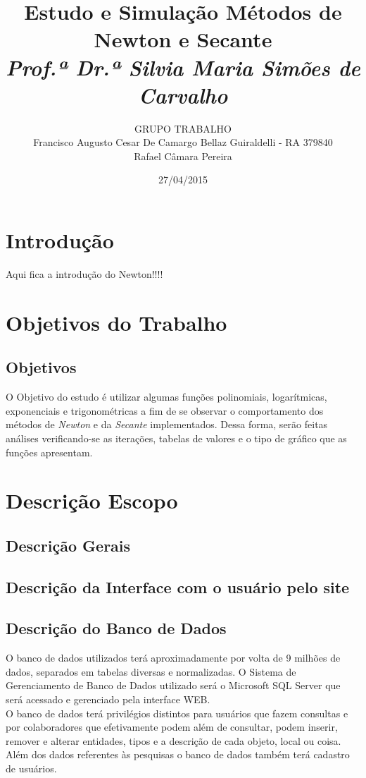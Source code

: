 \documentclass[ruledheader, 12pt, onecolumn, a4paper] {report}%
\author{GRUPO TRABALHO\\ Francisco Augusto Cesar De Camargo Bellaz Guiraldelli - RA 379840\\ Rafael Câmara Pereira}
\title {\LARGE{Estudo e Simulação Métodos de Newton e Secante} \\ \small{ \textit{Prof.ª Dr.ª Silvia Maria Simões de Carvalho }\vspace{10cm}} \\ }
\date {27/04/2015}
\begin{document}
\maketitle
\tableofcontents

\chapter{Introdução}
Aqui fica a introdução do Newton!!!!

\chapter{Objetivos do Trabalho}

\section{Objetivos}
O Objetivo do estudo é utilizar algumas funções polinomiais, logarítmicas, exponenciais e trigonométricas a fim de se observar o comportamento dos métodos de {\it Newton} e da {\it Secante} implementados. Dessa forma, serão feitas análises verificando-se as iterações, tabelas de valores e o tipo de gráfico que as funções apresentam.

\chapter{Descrição Escopo}

\section{Descrição Gerais}


\section{Descrição da Interface com o usuário pelo site}


\section{Descrição do Banco de Dados}
O banco de dados utilizados terá aproximadamente por volta de 9 milhões de dados, separados em tabelas diversas e normalizadas. O Sistema de Gerenciamento de Banco de Dados utilizado será o Microsoft SQL Server que será acessado e gerenciado pela interface WEB.\\
O banco de dados terá privilégios distintos para usuários que fazem consultas e por colaboradores que efetivamente podem além de consultar, podem inserir, remover e alterar entidades, tipos e a descrição de cada objeto, local ou coisa. Além dos dados referentes às pesquisas o banco de dados também terá cadastro de usuários.
\end{document}
